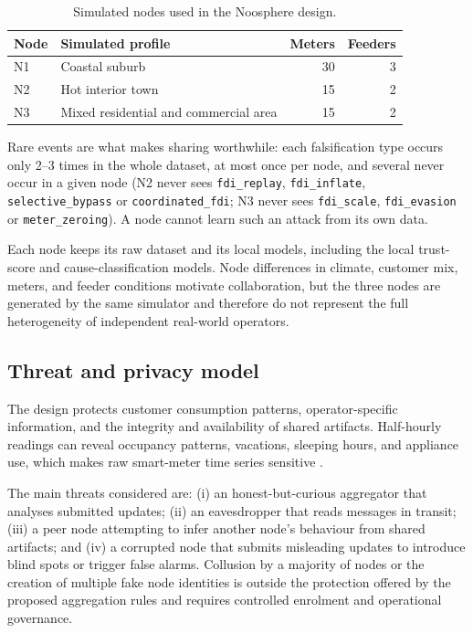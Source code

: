 \begin{table}[htbp]
\centering
\small
\caption{Simulated nodes used in the Noosphere design.}
\label{tab:goal4-nodes}
\begin{tabularx}{\textwidth}{@{}l X r r@{}}
\toprule
Node & Simulated profile & Meters & Feeders \\
\midrule
N1 & Coastal suburb & 30 & 3 \\
N2 & Hot interior town & 15 & 2 \\
N3 & Mixed residential and commercial area & 15 & 2 \\
\bottomrule
\end{tabularx}
\end{table}

Rare events are what makes sharing worthwhile: each falsification type occurs only 2--3 times in the whole dataset, at most once per node, and several never occur in a given node (N2 never sees \texttt{fdi\_replay}, \texttt{fdi\_inflate}, \texttt{selective\_bypass} or \texttt{coordinated\_fdi}; N3 never sees \texttt{fdi\_scale}, \texttt{fdi\_evasion} or \texttt{meter\_zeroing}). A node cannot learn such an attack from its own data.

Each node keeps its raw dataset and its local models, including the local trust-score and cause-classification models. Node differences in climate, customer mix, meters, and feeder conditions motivate collaboration, but the three nodes are generated by the same simulator and therefore do not represent the full heterogeneity of independent real-world operators.

\subsection{Threat and privacy model}
The design protects customer consumption patterns, operator-specific information, and the integrity and availability of shared artifacts. Half-hourly readings can reveal occupancy patterns, vacations, sleeping hours, and appliance use, which makes raw smart-meter time series sensitive \cite{hart1992}.

The main threats considered are: (i) an honest-but-curious aggregator that analyses submitted updates; (ii) an eavesdropper that reads messages in transit; (iii) a peer node attempting to infer another node's behaviour from shared artifacts; and (iv) a corrupted node that submits misleading updates to introduce blind spots or trigger false alarms. Collusion by a majority of nodes or the creation of multiple fake node identities is outside the protection offered by the proposed aggregation rules and requires controlled enrolment and operational governance.

